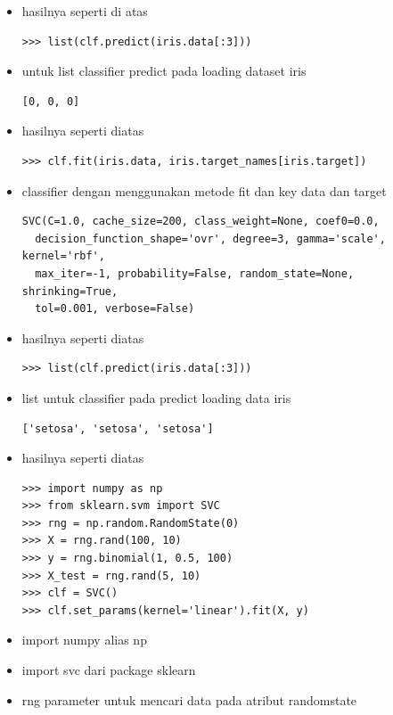 \begin{itemize}
\begin{verbatim}
SVC(C=1.0, cache_size=200, class_weight=None, coef0=0.0,
  decision_function_shape='ovr', degree=3, gamma='scale', kernel='rbf',
  max_iter=-1, probability=False, random_state=None, shrinking=True,
  tol=0.001, verbose=False)
\end{verbatim}
\item hasilnya seperti di atas
\begin{verbatim}
>>> list(clf.predict(iris.data[:3]))
\end{verbatim}
\item untuk list classifier predict pada loading dataset iris
\begin{verbatim}
[0, 0, 0]
\end{verbatim}
\item hasilnya seperti diatas
\begin{verbatim}
>>> clf.fit(iris.data, iris.target_names[iris.target])
\end{verbatim}
\item classifier dengan menggunakan metode fit dan key data dan target
\begin{verbatim}
SVC(C=1.0, cache_size=200, class_weight=None, coef0=0.0,
  decision_function_shape='ovr', degree=3, gamma='scale', kernel='rbf',
  max_iter=-1, probability=False, random_state=None, shrinking=True,
  tol=0.001, verbose=False)
\end{verbatim}
\item hasilnya seperti diatas
\begin{verbatim}
>>> list(clf.predict(iris.data[:3]))
\end{verbatim}
\item list untuk classifier pada predict loading data iris
\begin{verbatim}
['setosa', 'setosa', 'setosa']
\end{verbatim}
\item hasilnya seperti diatas
\begin{verbatim}
>>> import numpy as np
>>> from sklearn.svm import SVC
>>> rng = np.random.RandomState(0)
>>> X = rng.rand(100, 10)
>>> y = rng.binomial(1, 0.5, 100)
>>> X_test = rng.rand(5, 10)
>>> clf = SVC()
>>> clf.set_params(kernel='linear').fit(X, y)
\end{verbatim}
\item import numpy alias np
\item import svc dari package sklearn
\item rng parameter untuk mencari data pada atribut randomstate

\end{itemize}
